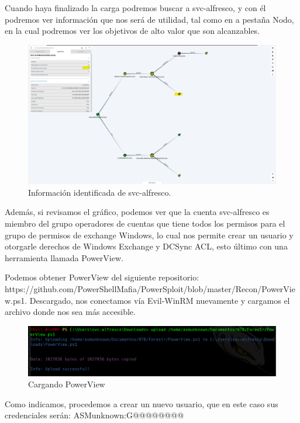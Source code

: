 \documentclass{article}
\begin{document}
Cuando haya finalizado la carga podremos buscar a svc-alfresco, y con él podremos ver información que nos será de utilidad, tal como en a pestaña Nodo, en la cual podremos ver los objetivos de alto valor que son alcanzables. 

\begin{figure}[H]
	\center
	\includegraphics[width=\textwidth]{images/forest/pertenencia_al_grupo_operators.png}
	\caption{Información identificada de svc-alfresco.}
\end{figure}

Además, si revisamos el gráfico, podemos ver que la cuenta svc-alfresco es miembro del grupo operadores de cuentas que tiene todos los permisos para el grupo de permisos de exchange Windows, lo cual nos permite crear un usuario y otorgarle derechos de Windows Exchange y DCSync ACL, esto último con una herramienta llamada PowerView.

Podemos obtener PowerView del siguiente repositorio: https://github.com/PowerShellMafia/PowerSploit/blob/master/Recon/PowerView.ps1. Descargado, nos conectamos vía Evil-WinRM nuevamente y cargamos el archivo donde nos sea más accesible.

\begin{figure}[H]
	\center
	\includegraphics[width=\textwidth]{images/forest/cargamos_powerviewwer.png}
	\caption{Cargando PowerView}
\end{figure}

Como indicamos, procedemos a crear un nuevo usuario, que en este caso sus credenciales serán: ASMunknown:G@@@@@@@@
\end{document}
